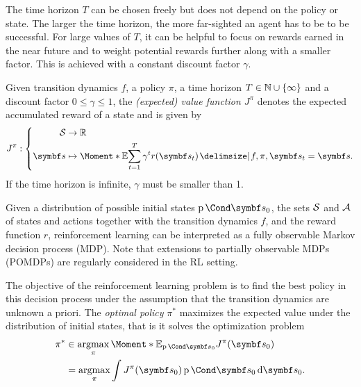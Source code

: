 The time horizon $T$ can be chosen freely but does not depend on the policy or state.
The larger the time horizon, the more far-sighted an agent has to be to be successful.
For large values of $T$, it can be helpful to focus on rewards earned in the near future and to weight potential rewards further along with a smaller factor.
This is achieved with a constant discount factor $\gamma$.
\begin{definition}
    \label{def:old_value_function}
    Given transition dynamics $f$, a policy $\pi$, a time horizon $T \in \mathbb{N} \cup \left\{ \infty \right\}$ and a discount factor $0 \leq \gamma \leq 1$, the \emph{(expected) value function $J^\pi$} denotes the expected accumulated reward of a state and is given by
    \begin{align}
        J^\pi : \left\{
            \begin{aligned}
                \Sc &\to \Rb \\
                \mat{s} &\mapsto \Moment*{\E}{\sum_{t=1}^T \gamma^t r(\mat{s}_t) \given f, \pi, \mat{s}_t = \mat{s}}.
            \end{aligned}
        \right.
    \end{align}
    If the time horizon is infinite, $\gamma$ must be smaller than 1.
\end{definition}

Given a distribution of possible initial states $\Prob{\mat{s}_0}$, the sets $\mathcal{S}$ and $\mathcal{A}$ of states and actions together with the transition dynamics $f$, and the reward function $r$, reinforcement learning can be interpreted as a fully observable Markov decision process (MDP).
Note that extensions to partially observable MDPs (POMDPs) are regularly considered in the RL setting.

The objective of the reinforcement learning problem is to find the best policy in this decision process under the assumption that the transition dynamics are unknown a priori.
The \emph{optimal policy} $\pi^*$ maximizes the expected value under the distribution of initial states, that is it solves the optimization problem
\begin{align}
    \label{eq:optimal_policy}
    \begin{split}
        \pi^\ast &\in \argmax_{\pi} \Moment*{\E_{\Prob{\mat{s}_0}}}{J^\pi(\mat{s}_0)} \\
        &= \argmax_{\pi} \int J^\pi(\mat{s}_0) \Prob{\mat{s}_0} \diff \mat{s}_0.
    \end{split}
\end{align}



